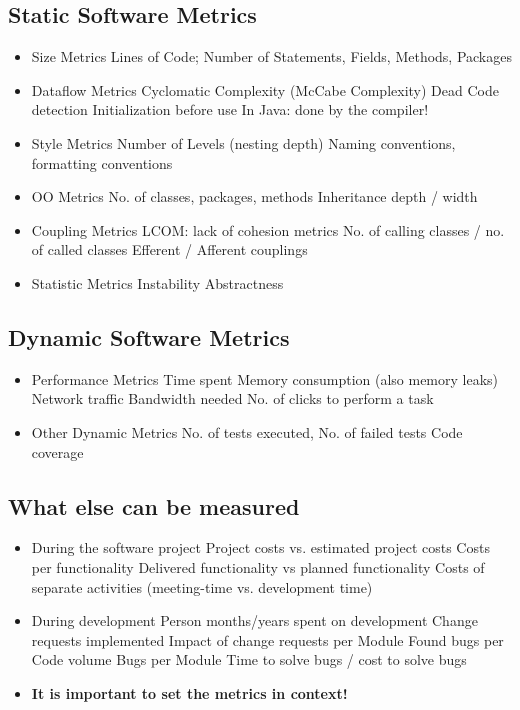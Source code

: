 \documentclass[10pt]{article}
\begin{document}
	\subsection{Static Software Metrics}
	\begin{itemize}
		\item  Size Metrics
			\subitem Lines of Code; Number of Statements, Fields, Methods, Packages
		\item Dataflow Metrics
			\subitem Cyclomatic Complexity (McCabe Complexity)
    		\subitem Dead Code detection Initialization before use
			\subitem In Java: done by the compiler!
  		\item Style Metrics
			\subitem Number of Levels (nesting depth)
			\subitem Naming conventions, formatting conventions
		\item OO Metrics
			\subitem No. of classes, packages, methods Inheritance depth / width
		\item Coupling Metrics
			\subitem LCOM: lack of cohesion metrics
			\subitem No. of calling classes / no. of called classes Efferent / Afferent couplings
		\item Statistic Metrics 
			\subitem Instability
			\subitem Abstractness
	\end{itemize}
	
	\subsection{Dynamic Software Metrics}
	\begin{itemize}
		\item Performance Metrics Time spent
			\subitem Memory consumption (also memory leaks) 
			\subitem Network traffic
			\subitem Bandwidth needed
			\subitem No. of clicks to perform a task
		\item Other Dynamic Metrics
			\subitem No. of tests executed, No. of failed tests 
			\subitem Code coverage
	\end{itemize}
	
	\subsection{What else can be measured}
	\begin{itemize}
		\item During the software project
			\subitem Project costs vs. estimated project costs
			\subitem Costs per functionality
			\subitem Delivered functionality vs planned functionality
			\subitem Costs of separate activities (meeting-time vs. development time)
		\item During development
			\subitem Person months/years spent on development 
			\subitem Change requests implemented
			\subitem Impact of change requests per Module 
			\subitem Found bugs per Code volume
			\subitem Bugs per Module
			\subitem Time to solve bugs / cost to solve bugs
		\item \textbf{It is important to set the metrics in context!}
	\end{itemize}
	
\end{document}
